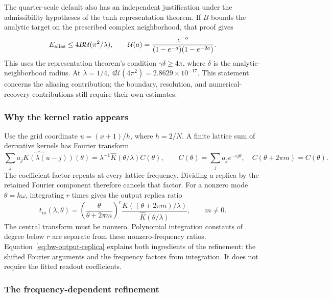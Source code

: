 The quarter-scale default also has an independent justification under the
admissibility hypotheses of the tanh representation theorem. If $B$ bounds
the analytic target on the prescribed complex neighborhood, that proof gives
\begin{equation}
 E_{\rm alias}\le4B\mathcal U(\pi^2/\lambda),\qquad
 \mathcal U(a)=\frac{e^{-a}}{(1-e^{-a})(1-e^{-2a})}.
 \label{eq:bw-quarter-class-bound}
\end{equation}
This uses the representation theorem's condition $\gamma\delta\ge4\pi$,
where $\delta$ is the analytic-neighborhood radius.
At $\lambda=1/4$, $4\mathcal U(4\pi^2)=2.8629\times10^{-17}$.
This statement concerns the aliasing contribution; the boundary, resolution,
and numerical-recovery contributions still require their own estimates.

\subsubsection{Why the kernel ratio appears}
\label{app:bw-replicas}

Use the grid coordinate $u=(x+1)/h$, where $h=2/N$. A finite lattice sum of
derivative kernels has Fourier transform
\begin{equation}
 \widehat{\sum_j a_jK(\lambda(u-j))}(\theta)
 =\lambda^{-1}\widehat K(\theta/\lambda)C(\theta),\qquad
 C(\theta)=\sum_j a_je^{-ij\theta},\quad
 C(\theta+2\pi m)=C(\theta).
 \label{eq:bw-lattice-spectrum}
\end{equation}
The coefficient factor repeats at every lattice frequency. Dividing a
replica by the retained Fourier component therefore cancels that factor.
For a nonzero mode $\theta=h\omega$, integrating $r$ times gives the output
replica ratio
\begin{equation}
 t_m(\lambda,\theta)=
 \left(\frac{\theta}{\theta+2\pi m}\right)^r
 \frac{\widehat K((\theta+2\pi m)/\lambda)}
      {\widehat K(\theta/\lambda)},\qquad m\ne0.
 \label{eq:bw-output-replica}
\end{equation}
The central transform must be nonzero. Polynomial integration constants of
degree below $r$ are separate from these nonzero-frequency ratios.
Equation~\eqref{eq:bw-output-replica} explains both ingredients of the
refinement: the shifted Fourier arguments and the frequency factors from
integration. It does not require the fitted readout coefficients.

\subsubsection{The frequency-dependent refinement}
\label{app:bw-refined-rule}

